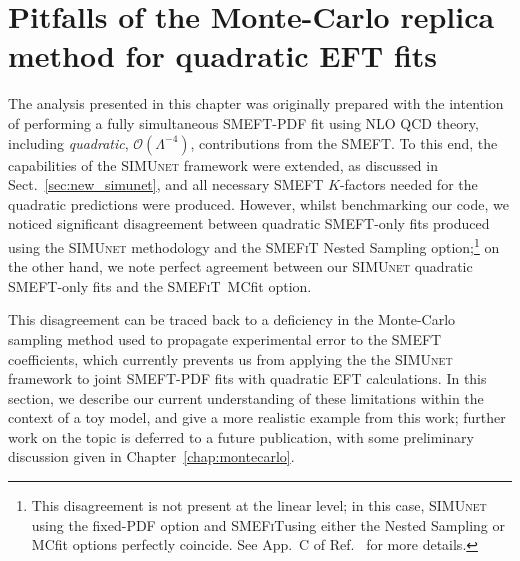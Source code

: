 \documentclass[withindex,glossary]{cam-thesis}
\newcommand{\simunet}{\textsc{SIMUnet}}
\newcommand{\smefit}{\textsc{SMEFiT}}
\begin{document}









\section{Pitfalls of the Monte-Carlo replica method for quadratic EFT fits}
\label{sec:quad}

The analysis presented in this chapter was originally prepared with the intention of performing a fully simultaneous SMEFT-PDF
fit using NLO QCD theory, including \textit{quadratic}, $\mathcal{O}\left( \Lambda^{-4}\right)$, contributions from the SMEFT.
To this end, the capabilities of the \simunet{} framework were extended, as discussed in Sect.~\ref{sec:new_simunet}, and
all necessary SMEFT $K$-factors needed for the quadratic predictions were produced.
%
However, whilst benchmarking our code, we noticed significant disagreement between quadratic SMEFT-only fits
produced using the \simunet{} methodology and the \smefit{} Nested Sampling option;\footnote{This disagreement is not present at the linear level; in this case, \simunet{} using the fixed-PDF option and \smefit using either the Nested Sampling or MCfit options perfectly coincide. See App.~C of Ref.~\cite{Kassabov:2023hbm} for more details.} on the other hand, we note perfect agreement
between our \simunet{} quadratic SMEFT-only fits and the \smefit{}~MCfit option.

This disagreement can be traced back to 
a deficiency in the Monte-Carlo sampling method used to propagate experimental error to the SMEFT coefficients, which
currently prevents us from applying the
the \simunet{} framework to joint SMEFT-PDF
fits with quadratic EFT calculations. 
%
In this section, we describe our current understanding of these limitations within the context of a toy model, 
and give a more realistic example from this work; further work on the topic is deferred to a future publication, with
some preliminary discussion given in Chapter~\ref{chap:montecarlo}.
\end{document}
